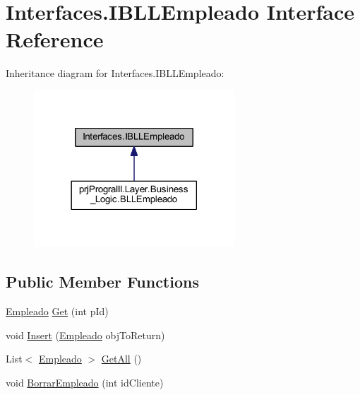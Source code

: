 \hypertarget{interface_interfaces_1_1_i_b_l_l_empleado}{}\section{Interfaces.\+I\+B\+L\+L\+Empleado Interface Reference}
\label{interface_interfaces_1_1_i_b_l_l_empleado}


Inheritance diagram for Interfaces.\+I\+B\+L\+L\+Empleado\+:
\nopagebreak
\begin{figure}[H]
\begin{center}
\leavevmode
\includegraphics[width=213pt]{interface_interfaces_1_1_i_b_l_l_empleado__inherit__graph}
\end{center}
\end{figure}
\subsection*{Public Member Functions}
\begin{DoxyCompactItemize}
\item 
\hyperlink{classprj_progra_i_i_i_1_1_layer_1_1_entities_1_1_empleado}{Empleado} \hyperlink{interface_interfaces_1_1_i_b_l_l_empleado_a9eea24cebb452257b579be1c998f4a98}{Get} (int p\+Id)
\item 
void \hyperlink{interface_interfaces_1_1_i_b_l_l_empleado_ae42950dd884578920123132ef21224b1}{Insert} (\hyperlink{classprj_progra_i_i_i_1_1_layer_1_1_entities_1_1_empleado}{Empleado} obj\+To\+Return)
\item 
List$<$ \hyperlink{classprj_progra_i_i_i_1_1_layer_1_1_entities_1_1_empleado}{Empleado} $>$ \hyperlink{interface_interfaces_1_1_i_b_l_l_empleado_af28eb97c31bd09546d3ececa39800ae4}{Get\+All} ()
\item 
void \hyperlink{interface_interfaces_1_1_i_b_l_l_empleado_a284b5811be96490bc0567612f428e8a5}{Borrar\+Empleado} (int id\+Cliente)
\end{DoxyCompactItemize}


